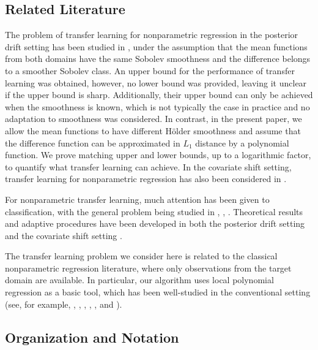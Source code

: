 \documentclass{article}
\def\holder{H\"{o}lder }
\begin{document}
\subsection{Related Literature}

The problem of transfer learning for nonparametric regression in the posterior drift setting has been studied in \citet{wang2016nonparametric}, under the assumption that the mean functions from both domains have the same Sobolev smoothness and the difference belongs to a smoother Sobolev class. An upper bound for the performance of transfer learning was obtained, however, no lower bound was provided, leaving it unclear if the upper bound is sharp. Additionally, their upper bound can only be achieved when the smoothness is known, which is not typically the case in practice and no adaptation to smoothness was considered. In contrast, in the present paper, we allow the mean functions to have different \holder smoothness and assume that the difference function can be approximated in $L_1$ distance by a polynomial function. We prove matching upper and lower bounds, up to a logarithmic factor, to quantify what transfer learning can achieve. In the covariate shift setting, transfer learning for nonparametric regression has also been considered in \cite{huang2006correcting, wen2014robust}.

For nonparametric transfer learning, much attention has been given to classification, with the general problem being studied in \citet{ben2007analysis}, \citet{blitzer2008learning}, \citet{mansour2009domain}. Theoretical results and adaptive procedures have been developed in both the posterior drift setting \citep{cai2021transfer, reeve2021adaptive} and the covariate shift setting \citep{shimodaira2000improving, sugiyama2007direct}.

The transfer learning problem we consider here is related to the classical nonparametric regression literature, where only observations from the target domain are available. In particular, our algorithm uses local polynomial regression as a basic tool, which has been well-studied in the conventional setting (see, for example, \citet{stone1977consistent}, \citet{cleveland1979robust}, \citet{tsybakov1986robust}, \citet{fan1992variable}, \citet{fan1993local}, and \citet{xiao2003more}).
 

\subsection{Organization and Notation}
\end{document}

